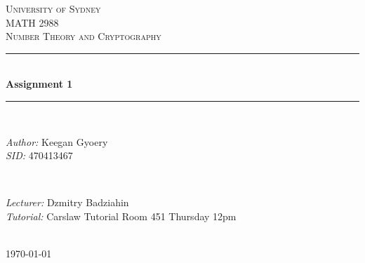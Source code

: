 \documentclass[a4paper]{article}
\begin{document}
\begin{titlepage}

\newcommand{\HRule}{\rule{\linewidth}{0.5mm}} %

\center %
 
\textsc{\LARGE University of Sydney}\\[1.5cm] %
\textsc{\Large MATH 2988}\\[0.5cm] %
\textsc{\large Number Theory and Cryptography}\\[0.5cm] %

\HRule \\[0.4cm]
{ \huge \bfseries Assignment 1}\\[0.4cm] %
\HRule \\[1.5cm]

\begin{minipage}{0.4\textwidth}
\begin{flushleft} \large
\emph{Author:}
Keegan Gyoery %
\\
\emph{SID:}
470413467
\end{flushleft}
\end{minipage}
~
\begin{minipage}{0.4\textwidth}
\begin{flushright} \large
\emph{Lecturer:} 
Dzmitry Badziahin %
\\
\emph{Tutorial:}
Carslaw Tutorial Room 451
Thursday 12pm
\end{flushright}
\end{minipage}\\[4cm]

{\large \today}\\[3cm] %

\vfill %

\end{titlepage}

\end{document}
